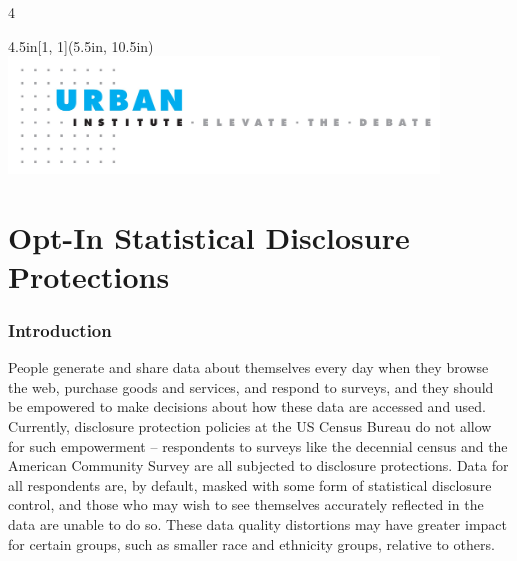 \documentclass[
]{urban-formatting}
\begin{document}
\begin{titlepage}
\begin{multicols}{4}
      
    \end{multicols}
    
    \vspace{-0.75cm}
    

    \begin{textblock*}{4.5in}[1, 1](5.5in, 10.5in)
        \noindent\includegraphics[width=4.5in]{images/cover-footer.jpg}
    \end{textblock*}
\end{titlepage}



\cleardoublepage

\setcounter{page}{3}
\begin{singlespace}
    \tableofcontents
\end{singlespace}

\thispagestyle{empty}





\part{Opt-In Statistical Disclosure Protections}

\section{Introduction}

People generate and share data about themselves every day when they
browse the web, purchase goods and services, and respond to surveys, and
they should be empowered to make decisions about how these data are
accessed and used. Currently, disclosure protection policies at the US
Census Bureau do not allow for such empowerment -- respondents to
surveys like the decennial census and the American Community Survey are
all subjected to disclosure protections. Data for all respondents are,
by default, masked with some form of statistical disclosure control, and
those who may wish to see themselves accurately reflected in the data
are unable to do so. These data quality distortions may have greater
impact for certain groups, such as smaller race and ethnicity groups,
relative to others.
\end{document}
